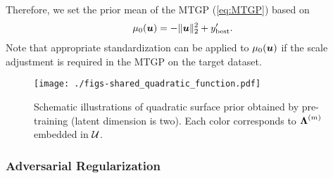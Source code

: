 %
Therefore, we set the prior mean of the MTGP (\ref{eq:MTGP}) based on %
\begin{align*}
 \mu_0(\boldsymbol{u}) = 
 - \| \boldsymbol{u} \|_2^2 + y_{\rm best}^\prime.
\end{align*}
Note that appropriate standardization can be applied to $\mu_0(\boldsymbol{u})$ if the scale adjustment is required in the MTGP on the target dataset.

\begin{figure}[t]
 \centering
 \texttt{[image: ./figs-shared\_quadratic\_function.pdf]}
 \caption{
 Schematic illustrations of quadratic surface prior obtained by pre-training (latent dimension is two).
 Each color corresponds to $\boldsymbol{\Lambda}^{(m)}$ embedded in ${\mathcal U}$.
 }
  \label{fig:contour}
\end{figure}

\subsubsection{Adversarial Regularization}

